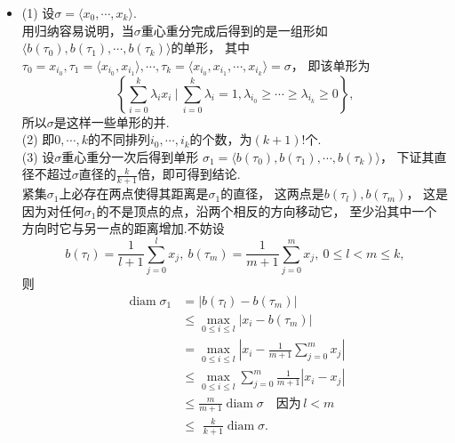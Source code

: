 \begin{itemize}
    \item[\textit{Pf:}]
    
    (1) 设$\sigma=\langle x_0,\cdots,x_k\rangle$.\\
    用归纳容易说明，当$\sigma$重心重分完成后得到的是一组形如
    $\langle b(\tau_0),b(\tau_1),\cdots,b(\tau_k)\rangle$的单形，
    其中$\tau_0=x_{i_0},\tau_1=\langle x_{i_0},x_{i_1}\rangle,\cdots,
    \tau_k=\langle x_{i_0},x_{i_1},\cdots,x_{i_k}\rangle=\sigma$，
    即该单形为
    \[
    \left\{\sum_{i=0}^k \lambda_i x_i\ \bigg|\ \sum_{i=0}^k \lambda_i=1,
    \lambda_{i_0}\geq\cdots\geq\lambda_{i_k}\geq0\right\},
    \]
    所以$\sigma$是这样一些单形的并.\\
    (2) 即$0,\cdots,k$的不同排列$i_0,\cdots,i_k$的个数，为$(k+1)!$个.\\
    (3) 设$\sigma$重心重分一次后得到单形
    $\sigma_1=\langle b(\tau_0),b(\tau_1),\cdots,b(\tau_k)\rangle$，
    下证其直径不超过$\sigma$直径的$\frac{k}{k+1}$倍，即可得到结论.\\
    紧集$\sigma_1$上必存在两点使得其距离是$\sigma_1$的直径，
    这两点是$b(\tau_l),b(\tau_m)$，
    这是因为对任何$\sigma_1$的不是顶点的点，沿两个相反的方向移动它，
    至少沿其中一个方向时它与另一点的距离增加.不妨设
    \[
        b(\tau_l)=\frac{1}{l+1}\sum_{j=0}^{l}x_j,\ 
        b(\tau_m)=\frac{1}{m+1}\sum_{j=0}^{m}x_j,\ 0\leq l<m\leq k,
    \]
    则
    \begin{align*}
        \operatorname{diam}\sigma_1&=|b(\tau_l)-b(\tau_m)|\\
        &\leq\max_{0\leq i\leq l}|x_i-b(\tau_m)|\\
        &=\max_{0\leq i\leq l}|x_i-\frac{1}{m+1}\sum_{j=0}^{m}x_j|\\
        &\leq\max_{0\leq i\leq l}\sum_{j=0}^{m}\frac{1}{m+1}|x_i-x_j|\\
        &\leq\frac{m}{m+1}\operatorname{diam}\sigma\quad 因为\,l<m\\
        &\leq\,\,\frac{k}{k+1}\operatorname{diam}\sigma.
    \end{align*}
    


\end{itemize}